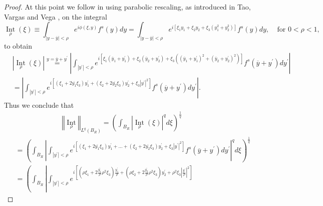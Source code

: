 \documentclass{amsart}%
\theoremstyle{plain}
\numberwithin{equation}{section}
\begin{document}
\begin{proof}
At this point we follow \cite{BoGu} in using parabolic rescaling, as
introduced in Tao, Vargas and Vega \cite{TaVaVe}, on the integral
\[
\operatorname*{Int}_{\rho}\left(  \xi\right)  \equiv\int_{\left\vert
y-\overline{y}\right\vert <\rho}e^{i\phi\left(  \xi,y\right)  }f^{s}\left(
y\right)  dy=\int_{\left\vert y-\overline{y}\right\vert <\rho}e^{i\left[
\xi_{1}y_{1}+\xi_{2}y_{2}+\xi_{3}\left(  y_{1}^{2}+y_{2}^{2}\right)  \right]
}f^{s}\left(  y\right)  dy,\ \ \ \ \ \text{for }0<\rho<1,
\]
to obtain%
\begin{align*}
&  \left\vert \operatorname*{Int}_{\rho}\left(  \xi\right)  \right\vert
\overset{y=\overline{y}+y^{\prime}}{=}\left\vert \int_{\left\vert y^{\prime
}\right\vert <\rho}e^{i\left[  \xi_{1}\left(  \overline{y}_{1}+y_{1}^{\prime
}\right)  +\xi_{2}\left(  \overline{y}_{2}+y_{2}^{\prime}\right)  +\xi
_{3}\left(  \left(  \overline{y}_{1}+y_{1}^{\prime}\right)  ^{2}+\left(
\overline{y}_{2}+y_{2}^{\prime}\right)  ^{2}\right)  \right]  }f^{s}\left(
\overline{y}+y^{\prime}\right)  dy^{\prime}\right\vert \\
&  =\left\vert \int_{\left\vert y^{\prime}\right\vert <\rho}e^{i\left[
\left(  \xi_{1}+2\overline{y_{1}}\xi_{3}\right)  y_{1}^{\prime}+\left(
\xi_{2}+2\overline{y_{2}}\xi_{3}\right)  y_{2}^{\prime}+\xi_{3}\left\vert
y^{\prime}\right\vert ^{2}\right]  }f^{s}\left(  \overline{y}+y^{\prime
}\right)  dy^{\prime}\right\vert .
\end{align*}
Thus we conclude that%
\begin{align}
&  \ \ \ \ \ \ \ \ \ \ \ \ \ \ \ \ \ \ \ \ \ \ \ \ \ \ \ \ \ \ \left\Vert
\operatorname*{Int}_{\rho}\right\Vert _{L^{q}\left(  B_{R}\right)  }=\left(
\int_{B_{R}}\left\vert \operatorname*{Int}_{\rho}\left(  \xi\right)
\right\vert ^{q}d\xi\right)  ^{\frac{1}{q}}\label{Int est}\\
&  =\left(  \int_{B_{R}}\left\vert \int_{\left\vert y^{\prime}\right\vert
<\rho}e^{i\left[  \left(  \xi_{1}+2\overline{y_{1}}\xi_{3}\right)
y_{1}^{\prime}+...+\left(  \xi_{2}+2\overline{y_{2}}\xi_{3}\right)
y_{2}^{\prime}+\xi_{3}\left\vert y^{\prime}\right\vert ^{2}\right]  }%
f^{s}\left(  \overline{y}+y^{\prime}\right)  dy^{\prime}\right\vert ^{q}%
d\xi\right)  ^{\frac{1}{q}}\nonumber\\
&  =\left(  \int_{B_{R}}\left\vert \int_{\left\vert y^{\prime}\right\vert
<\rho}e^{i\left[  \left(  \rho\xi_{1}+2\overline{\frac{y_{1}}{\rho}}\rho
^{2}\xi_{3}\right)  \frac{y_{1}^{\prime}}{\rho}+\left(  \rho\xi_{2}%
+2\overline{\frac{y_{2}}{\rho}}\rho^{2}\xi_{3}\right)  y_{2}^{\prime}+\rho
^{2}\xi_{3}\left\vert \frac{y^{\prime}}{\rho}\right\vert ^{2}\right]  }%

\end{align}
\end{proof}
\end{document}
